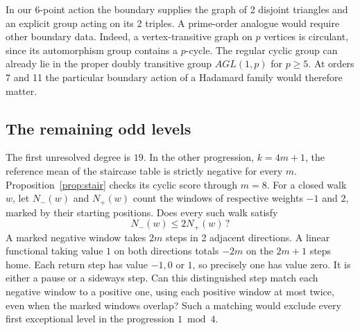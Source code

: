 \documentclass[11pt,a4paper]{amsart}
\begin{document}
In our 6-point action the boundary supplies the graph of 2 disjoint triangles and an explicit group acting on its 2 triples. A prime-order analogue would require other boundary data. Indeed, a vertex-transitive graph on $p$ vertices is circulant, since its automorphism group contains a $p$-cycle. The regular cyclic group can already lie in the proper doubly transitive group $AGL(1,p)$ for $p\geq5$. At orders 7 and 11 the particular boundary action of a Hadamard family would therefore matter.

\subsection{The remaining odd levels}
The first unresolved degree is $19$. In the other progression, $k=4m+1$, the reference mean of the staircase table is strictly negative for every $m$. Proposition~\ref{prop:stair} checks its cyclic score through $m=8$. For a closed walk $w$, let $N_-(w)$ and $N_+(w)$ count the windows of respective weights $-1$ and $2$, marked by their starting positions. Does every such walk satisfy
\[
 N_-(w)\leq 2N_+(w)\,?
\]
A marked negative window takes $2m$ steps in 2 adjacent directions. A linear functional taking value $1$ on both directions totals $-2m$ on the $2m+1$ steps home. Each return step has value $-1,0$ or $1$, so precisely one has value zero. It is either a pause or a sideways step. Can this distinguished step match each negative window to a positive one, using each positive window at most twice, even when the marked windows overlap? Such a matching would exclude every first exceptional level in the progression $1\bmod4$.
\end{document}
